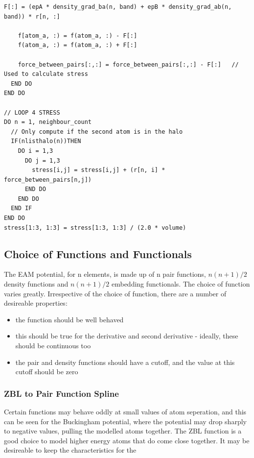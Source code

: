 \begin{lstlisting}[style=sPseudo,caption={Pseudo Code for Energy and Stress Force Calculation}]
    F[:] = (epA * density_grad_ba(n, band) + epB * density_grad_ab(n, band)) * r[n, :]

    f[atom_a, :) = f(atom_a, :) - F[:] 
    f(atom_a, :) = f(atom_a, :) + F[:] 
    
    force_between_pairs[:,:] = force_between_pairs[:,:] - F[:]   // Used to calculate stress
  END DO
END DO

// LOOP 4 STRESS
DO n = 1, neighbour_count
  // Only compute if the second atom is in the halo 
  IF(nlisthalo(n))THEN  
    DO i = 1,3
      DO j = 1,3
        stress[i,j] = stress[i,j] + (r[n, i] * force_between_pairs[n,j])
      END DO
    END DO
  END IF
END DO
stress[1:3, 1:3] = stress[1:3, 1:3] / (2.0 * volume)

\end{lstlisting}



\subsection{Choice of Functions and Functionals}

The EAM potential, for n elements, is made up of n pair functions, $n(n+1)/2$ density functions and $n(n+1)/2$ embedding functionals.  The choice of function varies greatly.  Irrespective of the choice of function, there are a number of desireable properties:


\begin{itemize}
\item the function should be well behaved
\item this should be true for the derivative and second derivative - ideally, these should be continuous too
\item the pair and density functions should have a cutoff, and the value at this cutoff should be zero
\end{itemize}

\subsubsection{ZBL to Pair Function Spline}

Certain functions may behave oddly at small values of atom seperation, and this can be seen for the Buckingham potential, where the potential may drop sharply to negative values, pulling the modelled atoms together.  The ZBL function is a good choice to model higher energy atoms that do come close together.  It may be desireable to keep the characteristics for the 








